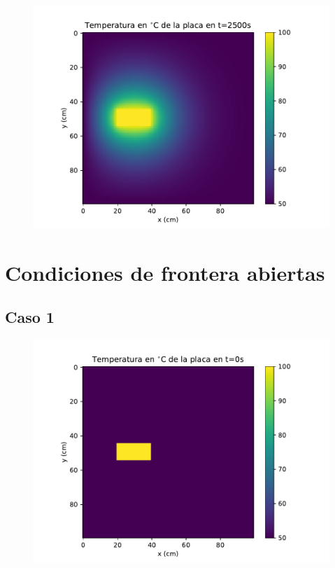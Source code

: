 \documentclass[12pt,letterpaper]{article}
\begin{document}
\begin{figure}[H]
\includegraphics{f2_2500.pdf}
\centering
\end{figure}

\section*{Condiciones de frontera abiertas}

\subsection*{Caso 1}

\begin{figure}[H]
\includegraphics{a1_0.pdf}
\centering
\end{figure}
\end{document}
